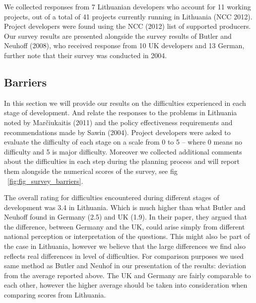 \documentclass[a4paper, 12pt]{article}
\begin{document}
We collected responses from 7 Lithuanian developers who account for 11 working projects, out of a total of 41 projects currently running in Lithuania (NCC 2012). Project developers were found using the NCC (2012) list of supported producers. Our survey results are presented alongside the survey results of Butler and Neuhoff (2008), who received response from 10 UK developers and 13 German, further note that their survey was conducted in 2004.

\subsection{Barriers}
In this section we will provide our results on the difficulties experienced in each stage of development. And relate the responses to the problems in Lithuania noted by Marčiukaitis (2011) and the policy effectiveness requirements and recommendations made by Sawin (2004). Project developers were asked to evaluate the difficulty of each stage on a scale from 0 to 5 – where 0 means no difficulty and 5 is major difficulty. Moreover we collected additional comments about the difficulties in each step during the planning process and will report them alongside the numerical scores of the survey, see fig ~\ref{fig:fig_survey_barriers}.

The overall rating for difficulties encountered during different stages of development was 3.4 in Lithuania. Which is much higher than what Butler and Neuhoff found in Germany (2.5) and UK (1.9). In their paper, they argued that the difference, between Germany and the UK, could arise simply from different national perception or interpretation of the questions. This might also be part of the case in Lithuania, however we believe that the large differences we find also reflects real differences in level of difficulties. For comparison purposes we used same method as Butler and Neuhof in our presentation of the results: deviation from the average reported above. The UK and Germany are fairly comparable to each other, however the higher average should be taken into consideration when comparing scores from Lithuania.
\end{document}
